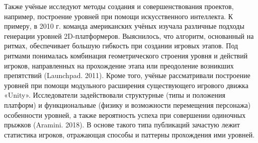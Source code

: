 Также учёные исследуют методы создания и совершенствования проектов, например, построение уровней при помощи искусственного интеллекта. К примеру, в 2010 г. команда американских учёных изучала различные подходы генерации уровней 2D-платформеров. Выяснилось, что алгоритм, основанный на ритмах, обеспечивает большую гибкость при создании игровых этапов. Под ритмами понималась комбинация геометрического строения уровня и действий игроков, направленных на прохождение этапа или преодоление возникших препятствий (Launchpad. 2011). Кроме того, учёные рассматривали построение уровней при помощи модульного расширения существующего игрового движка «Unity». Исследователи задействовали структурные (типы и положения платформ) и функциональные (физику и возможности перемещения персонажа) особенности уровней, а также вероятность успеха при совершении одиночных прыжков (Aramini. 2018). В основе такого типа публикаций зачастую лежит статистика игроков, отражающая способы и паттерны прохождения ими уровней.